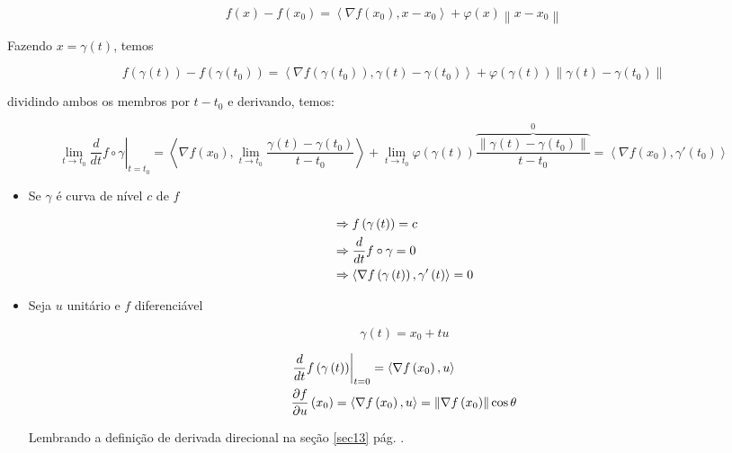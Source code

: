 \documentclass[11pt, oneside, a4paper]{gsm-l}
\begin{document}
\begin{dem}
\[
f\left( x \right) - f\left( {x_0 } \right) = \left\langle {\nabla f\left( {x_0 } \right),x - x_0 } \right\rangle  + \varphi \left( x \right)\left\| {x - x_0 } \right\|
\]

Fazendo $x = \gamma \left( t \right)$, temos

\[
f\left( {\gamma \left( t \right)} \right) - f\left( {\gamma \left( {t_0 } \right)} \right) = \left\langle {\nabla f\left( {\gamma \left( {t_0 } \right)} \right),\gamma \left( t \right) - \gamma \left( {t_0 } \right)} \right\rangle  + \varphi \left( {\gamma \left( {t} \right)} \right)\left\| {\gamma \left( t \right) - \gamma \left( {t_0 } \right)} \right\|
\]

dividindo ambos os membros por $t - t_0$ e derivando, temos:

\[
\scriptstyle{
\left. {\mathop {\lim }\limits_{t \to t_0 } \frac{d}
{{dt}}f \circ \gamma } \right|_{t = t_0 }  = \left\langle {\nabla f\left( {x_0 } \right),\mathop {\lim }\limits_{t \to t_0 } \frac{{\gamma \left( t \right) - \gamma \left( {t_0 } \right)}}
{{t - t_0 }}} \right\rangle  + \mathop {\lim }\limits_{t \to t_0 } \varphi \left( {\gamma \left( t \right)} \right)\overbrace {\frac{{\left\| {\gamma \left( t \right) - \gamma \left( {t_0 } \right)} \right\|}}
{{t - t_0 }}}^0 = \left\langle {\nabla f\left( {x_0 } \right),\gamma '\left( {t_0 } \right)} \right\rangle
}
\]

\end{dem}

\begin{itemize}
\item Se $\gamma$ é curva de nível $c$ de $f$

\[
\begin{gathered}
\Rightarrow f\left( {\gamma \left( t \right)} \right) = c \hfill \\
\Rightarrow \frac{d}
{{dt}}f \circ \gamma  = 0 \hfill \\
   \Rightarrow \left\langle {\nabla f\left( {\gamma \left( t \right)} \right),\gamma '\left( t \right)} \right\rangle  = 0 \hfill \\
\end{gathered}
\]

\item Seja $u$ unitário e $f$ diferenciável

\[
\gamma \left( t \right) = x_0  + tu
\]

\[
\begin{gathered}
\left. {\frac{d}
{{dt}}f\left( {\gamma \left( t \right)} \right)} \right|_{t = 0}  = \left\langle {\nabla f\left( {x_0 } \right),u} \right\rangle  \hfill \\
\frac{{\partial f}}
{{\partial u}}\left( {x_0 } \right) = \left\langle {\nabla f\left( {x_0 } \right),u} \right\rangle  = \left\| {\nabla f\left( {x_0 } \right)} \right\|\cos \theta  \hfill \\
\end{gathered}
\]

    Lembrando a definição de derivada direcional na seção \ref{sec13} pág. \pageref{sec13}.

\end{itemize}
\end{document}
